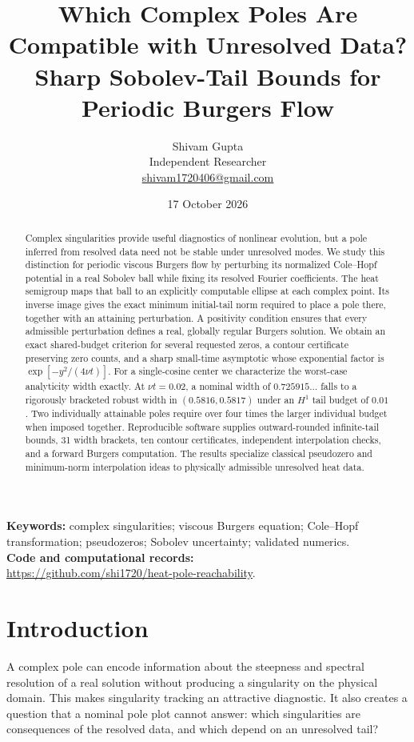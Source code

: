 \documentclass[11pt]{article}
\title{Which Complex Poles Are Compatible with Unresolved Data?\\[3pt]\large Sharp Sobolev-Tail Bounds for Periodic Burgers Flow}
\author{Shivam Gupta\\\small Independent Researcher\\\small\href{mailto:shivam1720406@gmail.com}{shivam1720406@gmail.com}}
\date{17 October 2026}
\begin{document}
\maketitle
\begin{abstract}
Complex singularities provide useful diagnostics of nonlinear evolution, but a pole inferred from resolved data need not be stable under unresolved modes. We study this distinction for periodic viscous Burgers flow by perturbing its normalized Cole--Hopf potential in a real Sobolev ball while fixing its resolved Fourier coefficients. The heat semigroup maps that ball to an explicitly computable ellipse at each complex point. Its inverse image gives the exact minimum initial-tail norm required to place a pole there, together with an attaining perturbation. A positivity condition ensures that every admissible perturbation defines a real, globally regular Burgers solution. We obtain an exact shared-budget criterion for several requested zeros, a contour certificate preserving zero counts, and a sharp small-time asymptotic whose exponential factor is $\exp[-y^2/(4\nu t)]$. For a single-cosine center we characterize the worst-case analyticity width exactly. At $\nu t=0.02$, a nominal width of $0.725915\ldots$ falls to a rigorously bracketed robust width in $(0.5816,0.5817)$ under an $H^1$ tail budget of $0.01$. Two individually attainable poles require over four times the larger individual budget when imposed together. Reproducible software supplies outward-rounded infinite-tail bounds, 31 width brackets, ten contour certificates, independent interpolation checks, and a forward Burgers computation. The results specialize classical pseudozero and minimum-norm interpolation ideas to physically admissible unresolved heat data.
\end{abstract}
\noindent\textbf{Keywords:} complex singularities; viscous Burgers equation; Cole--Hopf transformation; pseudozeros; Sobolev uncertainty; validated numerics.\\
\noindent\textbf{Code and computational records:}\\
\noindent\url{https://github.com/shi1720/heat-pole-reachability}.

\section{Introduction}
A complex pole can encode information about the steepness and spectral resolution of a real solution without producing a singularity on the physical domain. This makes singularity tracking an attractive diagnostic. It also creates a question that a nominal pole plot cannot answer: which singularities are consequences of the resolved data, and which depend on an unresolved tail?
\end{document}
